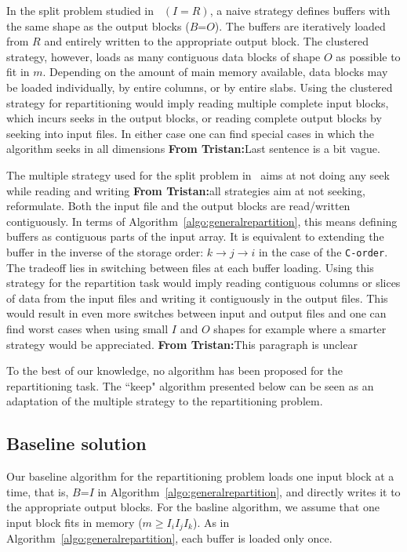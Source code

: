 \documentclass[conference]{IEEEtran}
\newcommand{\tristan}[1]{\color{orange}\textbf{From Tristan:}#1\color{black}}
\begin{document}
In the split problem studied in~\cite{seqalgorithms} $(I=R)$, a naive
strategy defines buffers with the same shape as the output blocks
($B$=$O$). The buffers are iteratively loaded from $R$ and entirely written
to the appropriate output block. The clustered strategy, however, loads as
many contiguous data blocks of shape $O$ as possible to fit in $m$.
Depending on the amount of main memory available, data blocks may be loaded
individually, by entire columns, or by entire slabs. Using the clustered
strategy for repartitioning would imply reading multiple complete input
blocks, which incurs seeks in the output blocks, or reading complete output
blocks by seeking into input files. In either case one can find special
cases in which the algorithm seeks in all dimensions \tristan{Last sentence is a bit vague}.

The multiple strategy used for the split problem  in~\cite{seqalgorithms}
aims at not doing any seek while reading and writing \tristan{all strategies aim at not seeking, reformulate}.
Both the input file and the output blocks are read/written contiguously. In
terms of Algorithm~\ref{algo:generalrepartition}, this means defining buffers as
contiguous parts of the input array. It is equivalent to extending the buffer
in the inverse of the storage order: $k \rightarrow j \rightarrow i$ in the case
of the \texttt{C-order}. The tradeoff lies in switching between files
at each buffer loading. Using this strategy for the repartition task would imply
reading contiguous columns or slices of data from the input files and writing it
contiguously in the output files. This would result in even more switches
between input and output files and one can find worst cases when using small
$I$ and $O$ shapes for example where a smarter strategy would be appreciated. \tristan{This paragraph is unclear}

To the best of our knowledge, no algorithm has been proposed for the
repartitioning task. The ``keep" algorithm presented below can be seen as an
adaptation of the multiple strategy to the repartitioning problem.

\subsection{Baseline solution}

Our baseline algorithm for the repartitioning problem loads one input block
at a time, that is, $B$=$I$ in
Algorithm~\ref{algo:generalrepartition}, and directly writes it to the appropriate output blocks.
For the basline algorithm, we assume that one input block fits in memory ($m \geq I_iI_jI_k$).
As in Algorithm~\ref{algo:generalrepartition}, each buffer is loaded only once.
\end{document}

